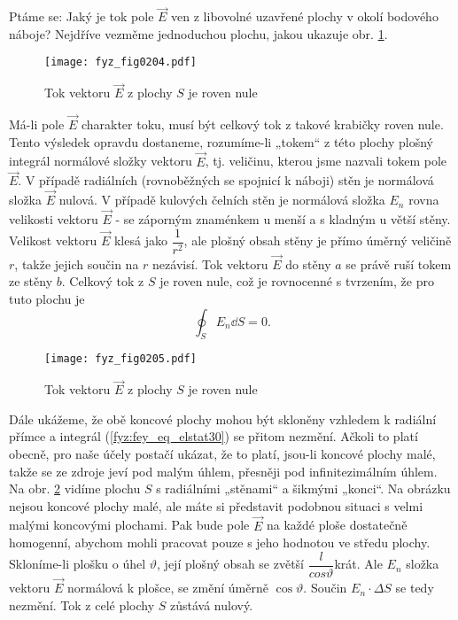     Ptáme se: Jaký je tok pole \(\vec{E}\) ven z libovolné uzavřené plochy v okolí bodového náboje? 
    Nejdříve vezměme jednoduchou plochu, jakou ukazuje obr. \ref{fyz:fig0204}. 
    
    \begin{figure}[ht!]  %
      \centering
      \texttt{[image: fyz\_fig0204.pdf]}
      \caption{Tok vektoru \(\vec{E}\) z plochy \(S\) je roven nule}
     \label{fyz:fig0204} 
    \end{figure}
    
    Má-li pole \(\vec{E}\) charakter toku, musí být celkový tok z takové krabičky roven nule. Tento 
    výsledek opravdu dostaneme, rozumíme-li „tokem“ z této plochy plošný integrál normálové složky 
    vektoru \(\vec{E}\), tj. veličinu, kterou jsme nazvali tokem pole \(\vec{E}\). V případě 
    radiálních (rovnoběžných se spojnicí k náboji) stěn je normálová složka \(\vec{E}\) nulová. V 
    případě kulových čelních stěn je normálová složka \(E_n\) rovna velikosti vektoru \(\vec{E}\) - 
    se záporným znaménkem u menší a s kladným u větší stěny. Velikost vektoru \(\vec{E}\) klesá 
    jako \(\dfrac{1}{r^2}\), ale plošný obsah stěny je přímo úměrný veličině \(r\), takže jejich 
    součin na \(r\) nezávisí. Tok vektoru \(\vec{E}\) do stěny \(a\) se právě ruší tokem ze stěny 
    \(b\). Celkový tok z \(S\) je roven nule, což je rovnocenné s tvrzením, že pro tuto plochu je
    \begin{equation}\label{fyz:fey_eq_elstat30}
    \oint_SE_n\dd{S} = 0.
    \end{equation}
    
    \begin{figure}[ht!]
      \centering
      \texttt{[image: fyz\_fig0205.pdf]}
      \caption{Tok vektoru \(\vec{E}\) z plochy \(S\) je roven nule}
      \label{fyz:fig0205} 
    \end{figure}

    Dále ukážeme, že obě koncové plochy mohou být skloněny vzhledem k radiální přímce a integrál 
    (\ref{fyz:fey_eq_elstat30}) se přitom nezmění. Ačkoli to platí obecně, pro naše účely postačí 
    ukázat, že to platí, jsou-li koncové plochy malé, takže se ze zdroje jeví pod malým úhlem, 
    přesněji pod infinitezimálním úhlem. Na obr. \ref{fyz:fig0205} vidíme plochu \(S\) s 
    radiálními „stěnami“ a šikmými „konci“. Na obrázku nejsou koncové plochy malé, ale máte si 
    představit podobnou situaci s velmi malými koncovými plochami. Pak bude pole \(\vec{E}\) na 
    každé ploše dostatečně homogenní, abychom mohli pracovat pouze s jeho hodnotou ve středu 
    plochy. Skloníme-li plošku o úhel \(\vartheta\), její plošný obsah se zvětší 
    \(\dfrac{l}{cos\vartheta}\)krát. Ale \(E_n\) složka vektoru \(\vec{E}\) normálová k plošce, se 
    změní úměrně \(\cos\vartheta\). Součin \(E_n\cdot\Delta S\) se tedy nezmění. Tok z celé plochy 
    \(S\) zůstává nulový.
      

